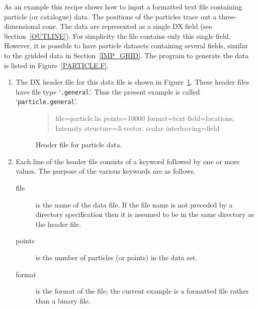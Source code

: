 \documentclass[twoside,11pt]{starlink}
\begin{document}
As an example this recipe shows how to input a formatted text file
containing particle (or catalogue) data. The positions of the particles
trace out a three-dimensional cone. The data are represented as a
single DX field (see Section~\ref{OUTLINE}). For simplicity the file
contains only this single field. However, it is possible to have
particle datasets containing several fields, similar to the gridded
data in Section~\ref{IMP_GRID}. The program to generate the data is listed
in Figure~\ref{PARTICLE.F}.

\begin{enumerate}

  \item The DX header file for this data file is shown in
   Figure~\ref{PARTICLE.GENERAL}. These header files have file type
   `\texttt{.general}'. Thus the present example is called `\texttt{particle.general}'.

  \begin{figure}[htbp]

  \begin{quote}
\begin{terminalv}
file=particle.lis
points=10000
format=text
field=locations, Intensity
structure=3-vector, scalar
interleaving=field
\end{terminalv}
  \end{quote}

  \caption[Header file for particle data.]{Header file for particle
   data. \label{PARTICLE.GENERAL} }

  \end{figure}

  \item Each line of the header file consists of a keyword followed by
   one or more values. The purpose of the various keywords are as follows.

  \begin{description}

    \item[file] is the name of the data file. If the file name is not
     preceded by a directory specification then it is assumed to be in
     the same directory as the header file.

    \item[points] is the number of particles (or points) in the data
     set.

    \item[format] is the format of the file; the current example is
     a formatted file rather than a binary file.


\end{description}
\end{enumerate}
\end{document}

